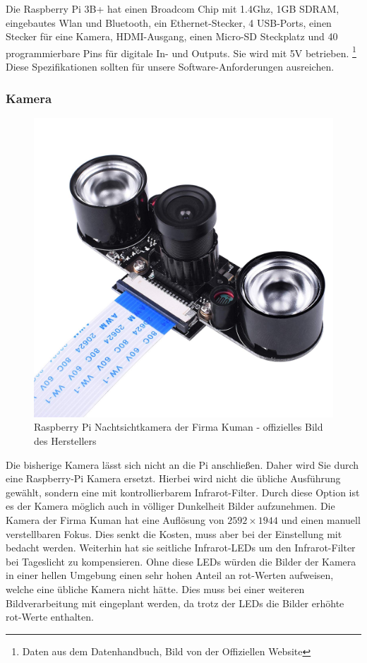 \documentclass[twoside,12pt,a4paper]{report}
\begin{document}
	Die Raspberry Pi 3B+ hat einen Broadcom Chip mit 1.4Ghz, 1GB SDRAM, eingebautes Wlan und Bluetooth, ein Ethernet-Stecker, 4 USB-Ports, einen Stecker für eine Kamera, HDMI-Ausgang, einen Micro-SD Steckplatz und 40 programmierbare Pins für digitale In- und Outputs. Sie wird mit 5V betrieben. \footnote{Daten aus dem Datenhandbuch, Bild von der Offiziellen Website}\\
	Diese Spezifikationen sollten für unsere Software-Anforderungen ausreichen. 
	
	\subsubsection{Kamera}
	
	\begin{figure}[!htb]
		\centering
		\includegraphics[scale=0.1]{images/Kuman_Kamera.jpg}
		\caption{Raspberry Pi Nachtsichtkamera der Firma Kuman - offizielles Bild des Herstellers}
	\end{figure}
	
	Die bisherige Kamera lässt sich nicht an die Pi anschließen. Daher wird Sie durch eine Raspberry-Pi Kamera ersetzt. Hierbei wird nicht die übliche Ausführung gewählt, sondern eine mit kontrollierbarem Infrarot-Filter. Durch diese Option ist es der Kamera möglich auch in völliger Dunkelheit Bilder aufzunehmen. Die Kamera der Firma Kuman hat eine Auflösung von $2592 \times 1944$ und einen manuell verstellbaren Fokus. Dies senkt die Kosten, muss aber bei der Einstellung mit bedacht werden. Weiterhin hat sie seitliche Infrarot-LEDs um den Infrarot-Filter bei Tageslicht zu kompensieren. Ohne diese LEDs würden die Bilder der Kamera in einer hellen Umgebung einen sehr hohen Anteil an rot-Werten aufweisen, welche eine übliche Kamera nicht hätte. Dies muss bei einer weiteren Bildverarbeitung mit eingeplant werden, da trotz der LEDs die Bilder erhöhte rot-Werte enthalten. 
	
\end{document}
